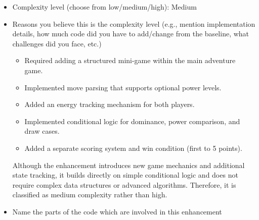 \documentclass[11pt]{article}
\begin{document}
\begin{enumerate}
\begin{itemize}
\bigskip
Scoring:
\begin{itemize}
\item Winner earns 1 point.
\item First player to reach 5 points wins the Arena.
\end{itemize}

\bigskip
Energy regeneration after each round:
\begin{itemize}
\item Winner gains +1 energy.
\item Loser gains +2 energy.
\item Draw: both gain +1 energy.
\end{itemize}

\bigskip
        \item Complexity level (choose from low/medium/high): Medium
        \item Reasons you believe this is the complexity level (e.g., mention implementation details, how much code did you have to add/change from the baseline, what challenges did you face, etc.)
        \begin{itemize}
            \item Required adding a structured mini-game within the main adventure game.
            \item Implemented move parsing that supports optional power levels.
            \item Added an energy tracking mechanism for both players.
            \item Implemented conditional logic for dominance, power comparison, and draw cases.
            \item Added a separate scoring system and win condition (first to 5 points).
        \end{itemize}
\bigskip
        Although the enhancement introduces new game mechanics and additional state tracking, it builds directly on simple conditional logic and does not require complex data structures or advanced algorithms. Therefore, it is classified as medium complexity rather than high.
        
        \item Name the parts of the code which are involved in this enhancement
        

\end{itemize}
\end{enumerate}
\end{document}
